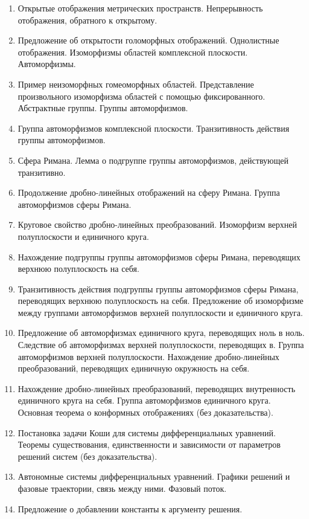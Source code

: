 \documentclass[a4paper,10pt]{article}
\begin{document}
\begin{enumerate}
  \item Открытые отображения метрических пространств.
        Непрерывность отображения, обратного к открытому.
  \item Предложение об открытости голоморфных отображений.
        Однолистные отображения.
        Изоморфизмы областей комплексной плоскости.
        Автоморфизмы.
  \item Пример неизоморфных гомеоморфных областей.
        Представление произвольного изоморфизма областей с помощью фиксированного.
        Абстрактные группы.
        Группы автоморфизмов.
  \item Группа автоморфизмов комплексной плоскости.
        Транзитивность действия группы автоморфизмов.
  \item Сфера Римана.
        Лемма о подгруппе группы автоморфизмов, действующей транзитивно.
  \item Продолжение дробно-линейных отображений на сферу Римана.
        Группа автоморфизмов сферы Римана.
  \item Круговое свойство дробно-линейных преобразований.
        Изоморфизм верхней полуплоскости и единичного круга.
  \item Нахождение подгруппы группы автоморфизмов сферы Римана, переводящих верхнюю полуплоскость на себя.
  \item Транзитивность действия подгруппы группы автоморфизмов сферы Римана, переводящих верхнюю полуплоскость на себя.
        Предложение об изоморфизме между группами автоморфизмов верхней полуплоскости и единичного круга.
  \item Предложение об автоморфизмах единичного круга, переводящих ноль в ноль.
        Следствие об автоморфизмах верхней полуплоскости, переводящих в.
        Группа автоморфизмов верхней полуплоскости.
        Нахождение дробно-линейных преобразований, переводящих единичную окружность на себя.
  \item Нахождение дробно-линейных преобразований, переводящих внутренность единичного круга на себя.
        Группа автоморфизмов единичного круга.
        Основная теорема о конформных отображениях (без доказательства).
  \item Постановка задачи Коши для системы дифференциальных уравнений.
        Теоремы существования, единственности и зависимости от параметров решений систем (без доказательства).
  \item Автономные системы дифференциальных уравнений.
        Графики решений и фазовые траектории, связь между ними.
        Фазовый поток.
  \item Предложение о добавлении константы к аргументу решения.

\end{enumerate}
\end{document}
